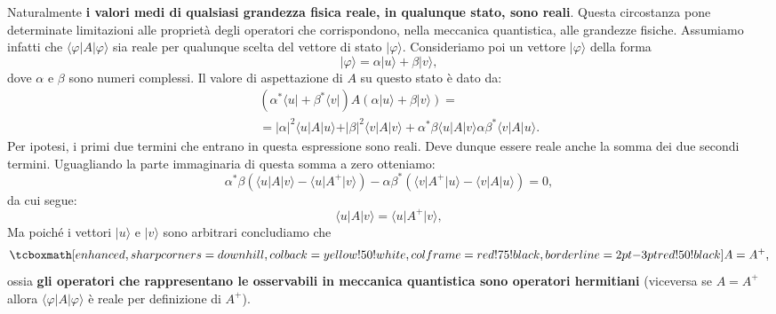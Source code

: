 Naturalmente \textbf{i valori medi di qualsiasi grandezza fisica reale, in qualunque stato, sono reali}. Questa circostanza pone determinate limitazioni alle proprietà degli operatori che corrispondono, nella meccanica quantistica, alle grandezze fisiche. Assumiamo infatti che $\langle \varphi \vert A \vert \varphi \rangle$ sia reale per qualunque scelta del vettore di stato $\vert \varphi \rangle$. Consideriamo poi un vettore $\vert \varphi \rangle$ della forma
	\begin{equation}
		\vert \varphi \rangle = \alpha \vert u \rangle + \beta \vert v \rangle,
	\end{equation}
dove $\alpha$ e $\beta$ sono numeri complessi. Il valore di aspettazione di $A$ su questo stato è dato da:
	\begin{eqnarray}
		& &\left( \alpha ^* \langle u \vert + \beta ^* \langle v \vert \right) A \left(\alpha \vert u \rangle + \beta \vert v \rangle \right) = \nonumber \\
		& &=\vert \alpha \vert ^2 \langle u \vert A \vert u \rangle + \vert \beta \vert ^2 \langle v \vert A \vert v \rangle + \alpha ^* \beta \langle u \vert A \vert v \rangle \alpha  \beta ^* \langle v \vert A \vert u \rangle.
	\end{eqnarray}
Per ipotesi, i primi due termini che entrano in questa espressione sono reali. Deve dunque essere reale anche la somma dei due secondi termini. Uguagliando la parte immaginaria di questa somma a zero otteniamo:
	\begin{equation}
		\label{eq:cap4_1}
		\alpha ^* \beta \left(\langle u \vert A \vert v \rangle -\langle u \vert A^{+} \vert v \rangle \right)-  \alpha  \beta ^* \left( \langle v \vert A^{+} \vert u \rangle -\langle v \vert A \vert u \rangle \right) =0, 
	\end{equation}
da cui segue:
	\begin{equation}
		\langle u \vert A \vert v \rangle = \langle u \vert A^{+} \vert v \rangle ,
	\end{equation}
Ma poiché i vettori $\vert u \rangle$ e $\vert v \rangle$ sono arbitrari concludiamo che
	\begin{equation}
		\tcboxmath[enhanced,sharp corners=downhill ,colback=yellow!50!white,colframe=red!75!black, borderline={2pt}{-3pt}{red!50!black}]{
			A= A^{+},
			}
	\end{equation}
ossia \textbf{gli operatori che rappresentano le osservabili in meccanica quantistica sono operatori hermitiani} (viceversa se $A= A^{+}$ allora $\langle \varphi \vert A \vert \varphi \rangle$ è reale per definizione di $A^{+}$).\\ \\

